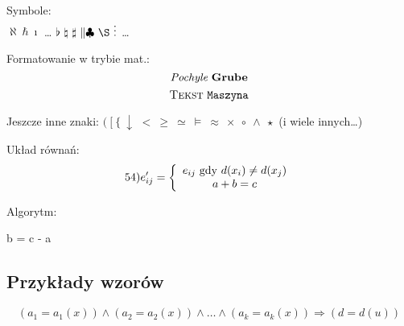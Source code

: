 ﻿\documentclass[a4paper,12pt]{article}
\begin{document}
Symbole:\\
$ \aleph \ \hbar \ \imath $ \dots 
$ \flat \ \natural \ \sharp \ \| \clubsuit \ \S \ \vdots $ \dots 


Formatowanie w trybie mat.: \\
$$	\emph{Pochyle} \ \textbf{Grube}$$
$$ \textsc{Tekst} \ \verb"Maszyna"	$$

Jeszcze inne znaki:
$ ( \ [ \ \{ \ \downarrow $
$ < \ \geq \ \simeq \ \models \ \approx \ \times \ \circ \ \wedge \ \star$
(i wiele innych\dots)

Układ równań:
$$54) e'_{ij}= 
\left \{ 
			\begin{array}{c}
			e_{ij} \ {\rm gdy}\ d(x_i) \neq d(x_j) \\
			a + b = c\\
\end{array}
\right. $$

Algorytm:
\begin{algorithmic}
\item{b = c - a}
\EndIf
\end{algorithmic}

\subsection{Przykłady wzorów}

\begin{displaymath}
(a_1=a_1(x)) \wedge (a_2=a_2(x)) \wedge \dots \wedge
(a_k=a_k(x)) \Rightarrow (d=d(u))
\end{displaymath}
\end{document}
